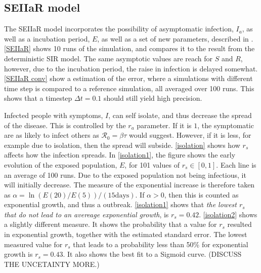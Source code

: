 \documentclass{article}
\begin{document}
    \subsection*{SEIIaR model}
    The SEIIaR model incorporates the possibility of asymptomatic infection, $I_a$, as well as a incubation period, $E$, as well as a set of new parameters, described in \cite{exam}.
    \autoref{SEIIaR} shows 10 runs of the simulation, and compares it to the result from the deterministic SIR model.
    The same asymptotic values are reach for $S$ and $R$, however, due to the incubation period, the raise in infection is delayed somewhat.
    \autoref{SEIIaR conv} show a estimation of the error, where a simulations with different time step is compared to a reference simulation, all averaged over 100 runs.
    This shows that a timestep $\Delta t = 0.1$ should still yield high precision.

    Infected people with symptoms, $I$, can self isolate, and thus decrease the spread of the disease.
    This is controlled by the $r_a$ parameter.
    If it is $1$, the symptomatic are as likely to infect others as $\mathcal{R}_0 = \beta \tau $ would suggest. 
    However, if it is less, for example due to isolation, then the spread will subside.
    \autoref{isolation} shows how $r_s$ affects how the infection spreads.
    In \autoref{isolation1}, the figure shows the early evolution of the exposed population, $E$, for 101 values of $r_s\in [0, 1]$.
    Each line is an average of 100 runs.
    Due to the exposed population not being infectious, it will initially decrease.
    The measure of the exponential increase is therefore taken as $\alpha = \ln\left(E(20)/E(5)\right)/(15 \mathrm{days})$.
    If $\alpha>0$, then this is counted as exponential growth, and thus a outbreak.
    \autoref{isolation1} shows that \emph{the lowest $r_s$ that do not lead to an avereage exponential growth}, is $r_s = 0.42$.
    \autoref{isolation2} shows a slightly different measure.
    It shows the probability that a value for $r_s$ resulted in exponential growth, together with the estimated standard error.
    The lowest measured value for $r_s$ that leads to a probability less than 50\% for exponential growth is $r_s = 0.43$.
    It also shows the best fit to a Sigmoid curve.
    (DISCUSS THE UNCETAINTY MORE.)
\end{document}
